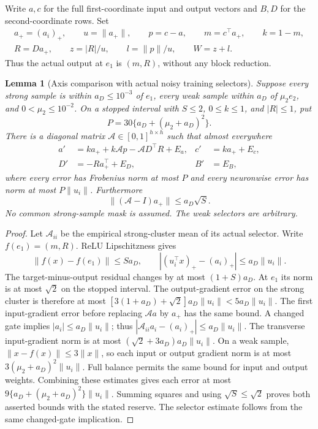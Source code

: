 \documentclass{article} %
\theoremstyle{plain}
\newtheorem{lemma}[theorem]{Lemma}
\theoremstyle{definition}
\theoremstyle{remark}
\begin{document}
Write $a,c$ for the full first-coordinate input and output vectors and
$B,D$ for the second-coordinate rows. Set
\begin{gather*}
 a_+=(a_i)_+,\qquad u=\|a_+\|,\qquad p=c-a,\qquad
 m=c^\top a_+,\qquad k=1-m,\\
 R=Da_+,\qquad z=|R|/u,\qquad l=\|p\|/u,\qquad W=z+l.
\end{gather*}
Thus the actual output at $e_1$ is $(m,R)$, without any block reduction.

\begin{lemma}[Axis comparison with actual noisy training selectors]
\label{sbwide:axis-system}
Suppose every strong sample is within $a_D\le10^{-3}$ of $e_1$, every
weak sample within $a_D$ of $\mu_2e_2$, and $0<\mu_2\le10^{-2}$.
On a stopped interval with $S\le2$, $0\le k\le1$, and $|R|\le1$, put
\[
 P=30\{a_D+(\mu_2+a_D)^2\}.
\]
There is a diagonal matrix $\mathcal A\in[0,1]^{h\times h}$ such that
almost everywhere
\begin{align}\label{sbwide:perturbed-axis}
 a'&=ka_++k\mathcal A p-\mathcal A D^\top R+E_a,
 &c'&=ka_++E_c,\\
 D'&=-Ra_+^\top+E_D,
 &B'&=E_B,\nonumber
\end{align}
where every error has Frobenius norm at most $P$ and every neuronwise
error has norm at most $P\|u_i\|$. Furthermore
\[
 \|(\mathcal A-I)a_+\|\le a_D\sqrt S.
\]
No common strong-sample mask is assumed. The weak selectors are arbitrary.
\end{lemma}
\begin{proof}
Let $\mathcal A_{ii}$ be the empirical strong-cluster mean of its actual
selector. Write $f(e_1)=(m,R)$. ReLU Lipschitzness gives
\[
 \|f(x)-f(e_1)\|\le Sa_D,\qquad
 |(u_i^\top x)_+-(a_i)_+|\le a_D\|u_i\|.
\]
The target-minus-output residual changes by at most $(1+S)a_D$.
At $e_1$ its norm is at most $\sqrt2$ on the stopped interval.
The output-gradient error on the strong cluster is therefore at most
$[3(1+a_D)+\sqrt2]a_D\|u_i\|<5a_D\|u_i\|$.
The first input-gradient error before replacing $\mathcal A a$ by $a_+$
has the same bound. A changed gate implies $|a_i|\le a_D\|u_i\|$;
thus $|\mathcal A_{ii}a_i-(a_i)_+|\le a_D\|u_i\|$.
The transverse input-gradient norm is at most
$(\sqrt2+3a_D)a_D\|u_i\|$.
On a weak sample, $\|x-f(x)\|\le3\|x\|$, so each input or output
gradient norm is at most $3(\mu_2+a_D)^2\|u_i\|$.
Full balance permits the same bound for input and output weights.
Combining these estimates gives each error at most
$9\{a_D+(\mu_2+a_D)^2\}\|u_i\|$.
Summing squares and using $\sqrt S\le\sqrt2$ proves both asserted
bounds with the stated reserve. The selector estimate follows from the
same changed-gate implication.
\end{proof}
\end{document}

